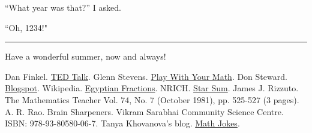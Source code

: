 \documentclass[12pt]{exam}         %
\begin{document}
``What year was that?'' I asked.

``Oh, 1234!"

\faSmileO

\par\noindent\rule{\textwidth}{0.4pt}

Have a wonderful summer, now and always!

\newpage
\begin{thebibliography}{00}
     Dan Finkel. \href{https://www.ted.com/talks/dan_finkel_5_ways_to_share_math_with_kids/transcript?language=en}{TED Talk}.
     Glenn Stevens. \href{https://playwithyourmath.com/2020/02/09/24-plus-minus/}{Play With Your Math}.
     Don Steward. \href{https://donsteward.blogspot.com/}{Blogspot}.
     Wikipedia. \href{https://en.wikipedia.org/wiki/Egyptian_fraction}{Egyptian Fractions}.
     NRICH. \href{https://nrich.maths.org/2206}{Star Sum}.
     James J. Rizzuto.  The Mathematics Teacher Vol. 74, No. 7 (October 1981), pp. 525-527 (3 pages).
     A. R. Rao. Brain Sharpeners. Vikram Sarabhai Community Science Centre. ISBN: 978-93-80580-06-7.
     Tanya Khovanova's blog. \href{https://blog.tanyakhovanova.com/category/math-humor/page/2/}{Math Jokes}.
\end{thebibliography}
\end{document}
